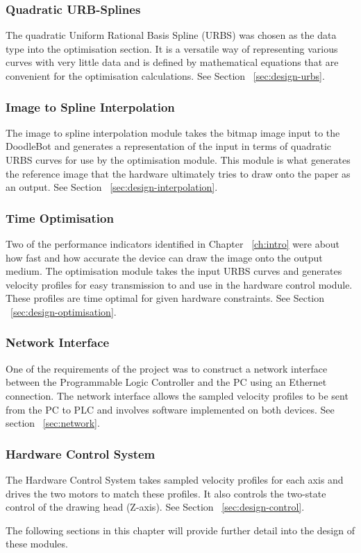 	\subsubsection*{Quadratic URB-Splines}
		The quadratic Uniform Rational Basis Spline (URBS) was chosen as the data type into the optimisation section. It is a versatile way of representing various curves with very little data and is defined by mathematical equations that are convenient for the optimisation calculations. See Section ~\ref{sec:design-urbs}.
		
	\subsubsection*{Image to Spline Interpolation}
		The image to spline interpolation module takes the bitmap image input to the DoodleBot and generates a representation of the input in terms of quadratic URBS curves for use by the optimisation module. This module is what generates the reference image that the hardware ultimately tries to draw onto the paper as an output. See Section ~\ref{sec:design-interpolation}.
		
	\subsubsection*{Time Optimisation}
		Two of the performance indicators identified in Chapter ~\ref{ch:intro} were about how fast and how accurate the device can draw the image onto the output medium. The optimisation module takes the input URBS curves and generates velocity profiles for easy transmission to and use in the hardware control module. These profiles are time optimal for given hardware constraints. See Section ~\ref{sec:design-optimisation}.

	\subsubsection*{Network Interface}
		One of the requirements of the project was to construct a network interface between the Programmable Logic Controller and the PC using an Ethernet connection. The network interface allows the sampled velocity profiles to be sent from the PC to PLC and involves software implemented on both devices. See section ~\ref{sec:network}.

	\subsubsection*{Hardware Control System}
		The Hardware Control System takes sampled velocity profiles for each axis and drives the two motors to match these profiles. It also controls the two-state control of the drawing head (Z-axis). See Section ~\ref{sec:design-control}.
		
The following sections in this chapter will provide further detail into the design of these modules.